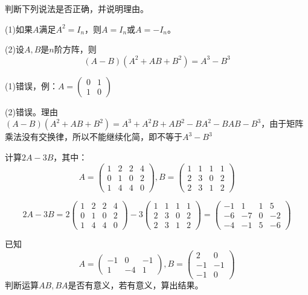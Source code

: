 \documentclass[a4paper]{report}
\begin{document}
\EX 判断下列说法是否正确，并说明理由。

(1)如果$A$满足$A^2=I_{n}$，则$A=I_{n}$或$A=-I_{n}$。

(2)设$A,B$是$n$阶方阵，则
\begin{equation*}
(A-B)(A^2+AB+B^2)=A^3-B^3
\end{equation*}

\begin{jie}
(1)错误，例：$A=
\begin{pmatrix}
0&1 \\ 1&0
\end{pmatrix}
$

(2)错误。理由$(A-B)(A^2+AB+B^2)=A^3+A^2B+AB^2-BA^{2}-BAB-B^3$，由于矩阵乘法没有交换律，所以不能继续化简，即不等于$A^3-B^3$
\end{jie}

\EX 计算$2A-3B$，其中：
\begin{equation*}
A=
\begin{pmatrix}
1&2&2&4\\
0&1&0&2\\
1&4&4&0
\end{pmatrix},B=
\begin{pmatrix}
1&1&1&1\\
2&3&0&2\\
2&3&1&2
\end{pmatrix}
\end{equation*}

\begin{jie}
\begin{equation*}
2A-3B=2\begin{pmatrix}
1&2&2&4\\
0&1&0&2\\
1&4&4&0
\end{pmatrix}-3\begin{pmatrix}
1&1&1&1\\
2&3&0&2\\
2&3&1&2
\end{pmatrix}=
\begin{pmatrix}
-1&1&1&5\\
-6&-7&0&-2\\
-4&-1&5&-6
\end{pmatrix}
\end{equation*}
\end{jie}

\EX 已知
\begin{equation*}
A=
\begin{pmatrix}
-1 & 0 &-1\\ 1 &-4 &1
\end{pmatrix},B=\begin{pmatrix}
                  2&0\\ -1&-1\\ -1&0
                \end{pmatrix}
\end{equation*}
判断运算$AB,BA$是否有意义，若有意义，算出结果。
\end{document}
